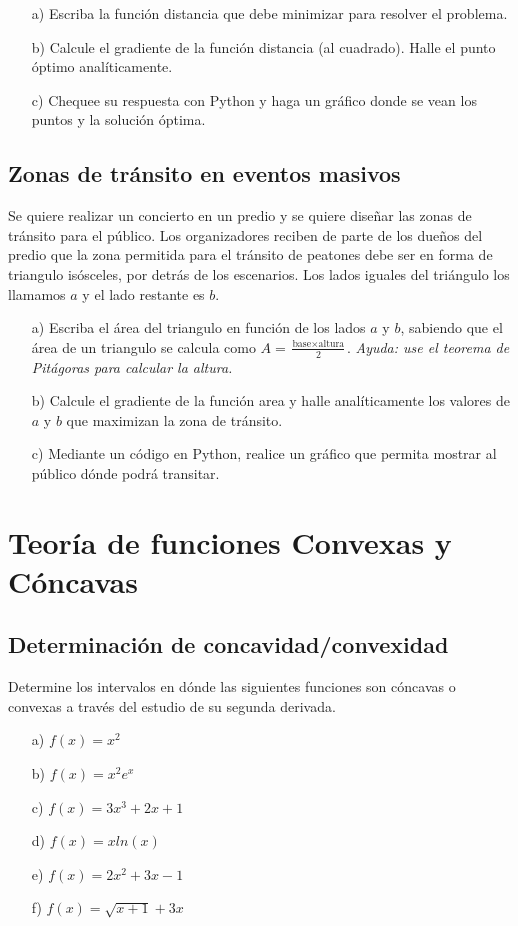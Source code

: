 \documentclass[12pt]{article}
\begin{document}
\begin{itemize}
    \item[a)] Escriba la función distancia que debe minimizar para resolver el problema.
    \item[b)] Calcule el gradiente de la función distancia (al cuadrado). Halle el punto óptimo analíticamente.
    \item[c)] Chequee su respuesta con Python y haga un gráfico donde se vean los puntos y la solución óptima.
\end{itemize}

\subsection{Zonas de tránsito en eventos masivos}

Se quiere realizar un concierto en un predio y se quiere diseñar las zonas de tránsito para el público. Los organizadores reciben de parte de los dueños del predio que la zona permitida para el tránsito de peatones debe ser en forma de triangulo isósceles, por detrás de los escenarios. Los lados iguales del triángulo los llamamos $a$ y el lado restante es $b$. 
\begin{itemize}
    \item[a)] Escriba el área del triangulo en función de los lados $a$ y $b$, sabiendo que el área de un triangulo se calcula como $A = \frac{\text{base}\times\text{altura}}{2}$. \textit{Ayuda: use el teorema de Pitágoras para calcular la altura.}
    \item[b)] Calcule el gradiente de la función area y halle analíticamente los valores de $a$ y $b$ que maximizan la zona de tránsito.
    \item[c)] Mediante un código en Python, realice un gráfico que permita mostrar al público dónde podrá transitar.
\end{itemize}

\section{Teoría de funciones Convexas y Cóncavas}

\subsection{Determinación de concavidad/convexidad}

Determine los intervalos en dónde las siguientes funciones son cóncavas o convexas a través del estudio de su segunda derivada. 
\begin{itemize}
    \item[a)] $f(x) = x^2$
    \item[b)] $f(x) = x^2 e^{x}$
    \item[c)] $f(x) = 3x^3 + 2x + 1$
    \item[d)] $f(x) = x ln(x)$
    \item[e)] $f(x) = 2 x^2 + 3x - 1 $
    \item[f)] $f(x) = \sqrt{x+1} + 3x $    
\end{itemize}
\end{document}
